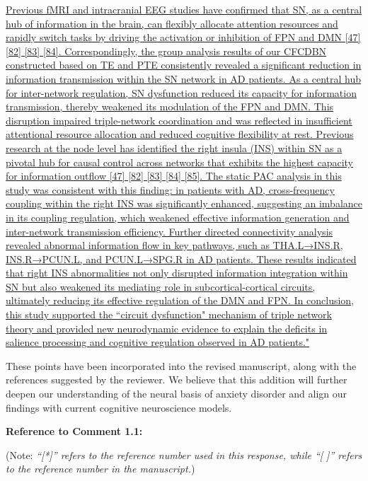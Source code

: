 \documentclass[12pt,technote,onecolumn]{IEEEtran}
\begin{document}
\uline{Previous fMRI and intracranial EEG studies have confirmed that SN, as a central hub of information in the brain, can flexibly allocate attention resources and rapidly switch tasks by driving the activation or inhibition of FPN and DMN [47] [82] [83] [84]. Correspondingly, the group analysis results of our CFCDBN constructed based on TE and PTE consistently revealed a significant reduction in information transmission within the SN network in AD patients. As a central hub for inter-network regulation, SN dysfunction reduced its capacity for information transmission, thereby weakened its modulation of the FPN and DMN. This disruption impaired triple-network coordination and was reflected in insufficient attentional resource allocation and reduced cognitive flexibility at rest. Previous research at the node level has identified the right insula (INS) within SN as a pivotal hub for causal control across networks that exhibits the highest capacity for information outflow [47] [82] [83] [84] [85]. The static PAC analysis in this study was consistent with this finding: in patients with AD, cross-frequency coupling within the right INS was significantly enhanced, suggesting an imbalance in its coupling regulation, which weakened effective information generation and inter-network transmission efficiency. Further directed connectivity analysis revealed abnormal information flow in key pathways, such as THA.L→INS.R, INS.R→PCUN.L, and PCUN.L→SPG.R in AD patients. These results indicated that right INS abnormalities not only disrupted information integration within SN but also weakened its mediating role in subcortical-cortical circuits, ultimately reducing its effective regulation of the DMN and FPN. In conclusion, this study supported the ``circuit dysfunction" mechanism of triple network theory and provided new neurodynamic evidence to explain the deficits in salience processing and cognitive regulation observed in AD patients."}

These points have been incorporated into the revised manuscript, along with the references suggested by the reviewer. We believe that this addition will further deepen our understanding of the neural basis of anxiety disorder and align our findings with current cognitive neuroscience models.

\vspace{1mm}

\noindent \textbf{Reference to Comment 1.1:} 

\noindent(Note: \textit{``[*]'' refers to the reference number used in this response, while ``[ ]'' refers to the reference number in the manuscript.})
\end{document}
